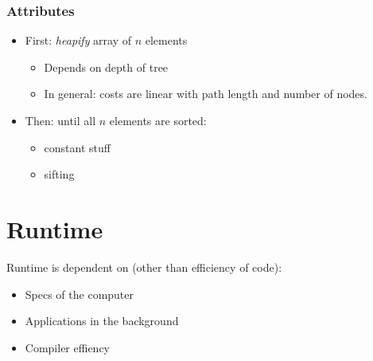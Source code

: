 \documentclass[12pt, a4paper]{scrartcl}
\begin{document}
 \subsubsection{Attributes}
\label{sec:heapsort_attr}
\begin{itemize}
\item First: \emph{heapify} array of $n$ elements
  \begin{itemize}
  \item Depends on depth of tree
  \item In general: costs are linear with path length and number of nodes.
  \end{itemize}
\item Then: until all $n$ elements are sorted:
  \begin{itemize}
  \item constant stuff
  \item sifting
  \end{itemize}
\end{itemize}

  
 
\section{Runtime}
\label{sec:runtime}
Runtime is dependent on (other than efficiency of code):
\begin{itemize}
\item Specs of the computer
\item Applications in the background
\item Compiler effiency
\end{itemize}
\end{document}
